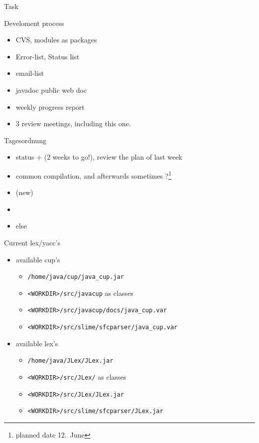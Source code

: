 

\begin{myslide}{Task}
  
\end{myslide}


\begin{myslide}{Develoment process}
  \begin{itemize}
  \item CVS, modules as packages
  \item Error-list, Status list
  \item email-list
  \item javadoc public web doc
  \item weekly progress report
  \item 3 review meetings, including this one. 
  \end{itemize}
\end{myslide}



\begin{myslide}{Tagesordnung}
  \begin{itemize}
  \item status +  (2 weeks to go!), review the plan of
      last week
  \item common compilation, and afterwards sometimes
    ?\footnote{planned date 12.\ June}
  \item (new) 
  \item {}
  \item else
  \end{itemize}
  
\end{myslide}
\begin{myslide}{Current lex/yacc's}
  \begin{itemize}
  \item available cup's
    \begin{itemize}
    \item \verb+/home/java/cup/java_cup.jar+
    \item \verb+<WORKDIR>/src/javacup+ as classes
    \item \verb+<WORKDIR>/src/javacup/docs/java_cup.var+ 
    \item \verb+<WORKDIR>/src/slime/sfcparser/java_cup.var+ 
    \end{itemize}
  \item available lex's
    \begin{itemize}
    \item \verb+/home/java/JLex/JLex.jar+
    \item \verb+<WORKDIR>/src/JLex/+ as classes
    \item \verb+<WORKDIR>/src/JLex/JLex.jar+
    \item \verb+<WORKDIR>/src/slime/sfcparser/JLex.jar+ 
    \end{itemize}
  \end{itemize}
\end{myslide}

